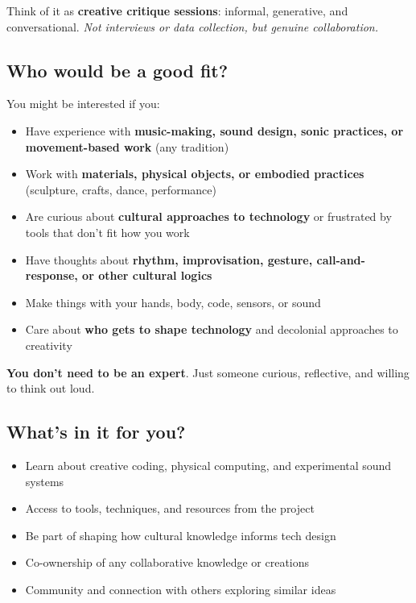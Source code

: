 Think of it as \textbf{creative critique sessions}: informal, generative, and conversational. \emph{Not interviews or data collection, but genuine collaboration.}

\subsection*{Who would be a good fit?}

You might be interested if you:

\begin{itemize}[noitemsep]
	\item Have experience with \textbf{music-making, sound design, sonic practices, or movement-based work} (any tradition)
	\item Work with \textbf{materials, physical objects, or embodied practices} (sculpture, crafts, dance, performance)
	\item Are curious about \textbf{cultural approaches to technology} or frustrated by tools that don't fit how you work
	\item Have thoughts about \textbf{rhythm, improvisation, gesture, call-and-response, or other cultural logics}
	\item Make things with your hands, body, code, sensors, or sound
	\item Care about \textbf{who gets to shape technology} and decolonial approaches to creativity
\end{itemize}

\textbf{You don't need to be an expert}. Just someone curious, reflective, and willing to think out loud.

\subsection*{What's in it for you?}

\begin{itemize}[noitemsep]
	\item Learn about creative coding, physical computing, and experimental sound systems
	\item Access to tools, techniques, and resources from the project
	\item Be part of shaping how cultural knowledge informs tech design
	\item Co-ownership of any collaborative knowledge or creations
	\item Community and connection with others exploring similar ideas
\end{itemize}


